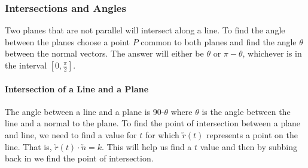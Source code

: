 \documentclass[a4paper,twoside,10pt]{article}
\begin{document}
			\subsubsection{Intersections and Angles}
				Two planes that are not parallel will intersect along a line. To find the angle between the planes choose a point $P$ common to both planes and find the angle $\theta$ between the normal vectors. The answer will either be $\theta$ or $\pi-\theta$, whichever is in the interval $[0,\frac{\pi}{2}]$.
				
				\paragraph{Intersection of a Line and a Plane} The angle between a line and a plane is 90\degree-$\theta$ where $\theta$ is the angle between the line and a normal to the plane. To find the point of intersection between a plane and line, we need to find a value for $t$ for which $\utilde{r}(t)$ represents a point on the line. That is, $\utilde{r}(t)\cdot\utilde{n}=k$. This will help us find a $t$ value and then by subbing back in we find the point of intersection.
\end{document}
